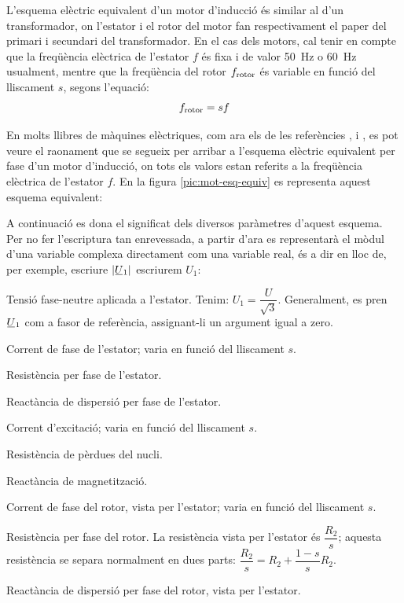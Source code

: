 L'esquema elèctric equivalent d'un motor d'inducció és similar al d'un transformador, on l'estator i el rotor del motor fan respectivament el paper del primari i  secundari del transformador. En el cas dels motors, cal tenir en compte que la freqüència elèctrica de l'estator $f$ és fixa i de valor \qty{50}{Hz} o \qty{60}{Hz} usualment, mentre que la freqüència del rotor $f_\mathrm{rotor}$ és variable en funció del lliscament $s$, segons l'equació:
\begin{equation}
    f_\mathrm{rotor} = s f
\end{equation}

En molts llibres de màquines elèctriques, com ara els de les referències \cite{CHA}, \cite{FIT} i \cite{JFM}, es pot veure el raonament que se segueix per arribar a l'esquema elèctric equivalent per fase d'un motor d'inducció, on tots els valors estan referits a la freqüència elèctrica de l'estator $f$. En la figura \vref{pic:mot-esq-equiv} es representa aquest esquema equivalent:

\begin{center}
    
    \label{pic:mot-esq-equiv}
\end{center}

A continuació es dona el significat dels diversos paràmetres d'aquest esquema. Per no fer l'escriptura tan enrevessada, a partir d'ara es representarà el mòdul d'una variable complexa  directament com una variable real, és a dir en lloc de, per exemple, escriure $|\cmplx{U}_1|$ escriurem $U_1$:

\begin{list}{}
   {\setlength{\labelwidth}{10mm} \setlength{\leftmargin}{15mm} \setlength{\labelsep}{5mm}}
   \item[$\cmplx{U}_1$] Tensió fase-neutre aplicada a l'estator. Tenim: $U_1 = \dfrac{U}{\sqrt{3}}$. Generalment,   es pren $\cmplx{U}_1$ com a fasor de referència, assignant-li un argument igual a zero.
   \item[$\cmplx{I}_1(s)$] Corrent de fase de l'estator; varia en funció del lliscament $s$.
   \item[$R_1$] Resistència per fase de l'estator.
   \item[$X_1$] Reactància de dispersió per fase de l'estator.
   \item[$\cmplx{I}_0(s)$] Corrent d'excitació; varia en funció del lliscament $s$.
   \item[$R\ped{Fe}$] Resistència de pèrdues del nucli.
   \item[$X\ped{m}$] Reactància de magnetització.
   \item[$\cmplx{I}_2(s)$] Corrent de fase del rotor, vista per l'estator; varia en funció del lliscament $s$.
   \item[$R_2$] Resistència per fase del rotor. La resistència vista per l'estator és $\dfrac{R_2}{s}$; aquesta resistència  se separa normalment en dues parts: $\dfrac{R_2}{s} = R_2 + \dfrac{1-s}{s} R_2$.
   \item[$X_2$] Reactància de dispersió per fase del rotor, vista per l'estator.
\end{list}

